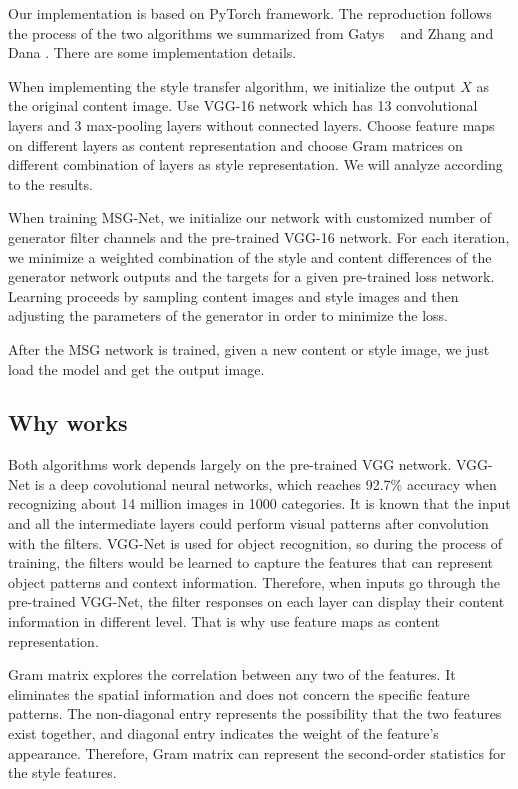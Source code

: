 \documentclass[10pt,twocolumn,letterpaper]{article}
\begin{document}
Our implementation is based on PyTorch framework. The reproduction follows the process of the two algorithms we summarized from Gatys \etal~\cite{Authors01} and Zhang and Dana \cite{Authors04}. There are some implementation details.

When implementing the style transfer algorithm, we initialize the output $X$ as the original content image. Use VGG-16 network which has 13 convolutional layers and 3 max-pooling layers without connected layers. Choose feature maps on different layers as content representation and choose Gram matrices on different combination of layers as style representation. We will analyze according to the results.

When training MSG-Net, we initialize our network with customized number of generator filter channels and the pre-trained VGG-16 network. For each iteration, we minimize a weighted combination of the style and content differences of the generator network outputs and the targets for a given pre-trained loss network. Learning proceeds by sampling content images and style images and then adjusting the parameters of the generator in order to minimize the loss.

After the MSG network is trained, given a new content or style image, we just load the model and get the output image. 


\subsection{Why works}
Both algorithms work depends largely on the pre-trained VGG network. VGG-Net \cite{Authors05} is a deep covolutional neural networks, which reaches 92.7\% accuracy when recognizing about 14 million images in 1000 categories. It is known that the input and all the intermediate layers could perform visual patterns after convolution with the filters. VGG-Net is used for object recognition, so during the process of training, the filters would be learned to capture the features that can represent object patterns and context information. Therefore, when inputs go through the pre-trained VGG-Net, the filter responses on each layer can display their content information in different level. That is why use feature maps as content representation.

Gram matrix explores the correlation between any two of the features. It eliminates the spatial information and does not concern the specific feature patterns. The non-diagonal entry represents the possibility that the two features exist together, and diagonal entry indicates the weight of the feature's appearance. Therefore, Gram matrix can represent the second-order statistics for the style features.
\end{document}
